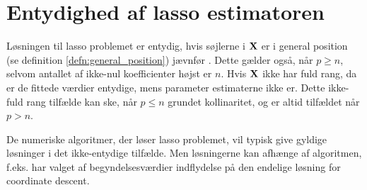\section{Entydighed af lasso estimatoren}
Løsningen til lasso problemet er entydig, hvis søjlerne i \(\mathbf{X}\) er i general position (se definition \ref{defn:general_position}) jævnfør \citep{lasso_unique}.
Dette gælder også, når \(p \geq n\), selvom antallet af ikke-nul koefficienter højst er \(n\).
Hvis \(\mathbf{X}\) ikke har fuld rang, da er de fittede værdier entydige, mens parameter estimaterne ikke er.
Dette ikke-fuld rang tilfælde kan ske, når \(p \leq n\) grundet kollinaritet, og er altid tilfældet når \(p>n\).

De numeriske algoritmer, der løser lasso problemet, vil typisk give gyldige løsninger i det ikke-entydige tilfælde.
Men løsningerne kan afhænge af algoritmen, f.eks. har valget af begyndelsesværdier indflydelse på den endelige løsning for coordinate descent.

%


